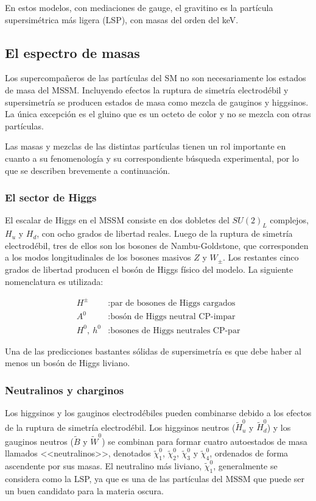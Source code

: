 En estos modelos, con mediaciones de gauge, el gravitino es la partícula supersimétrica más ligera (LSP), con masas del orden del keV.

\subsection{El espectro de masas}

Los supercompañeros de las partículas del SM no son necesariamente los estados de masa del MSSM. Incluyendo efectos la ruptura de simetría electrodébil y supersimetría se producen estados de masa como mezcla de gauginos y higgsinos. La única excepción es el gluino que es un octeto de color y no se mezcla con otras partículas.

Las masas y mezclas de las distintas partículas tienen un rol importante en cuanto a su fenomenología y su correspondiente búsqueda experimental, por lo que se describen brevemente a continuación.


\subsubsection{El sector de Higgs} 

El escalar de Higgs en el MSSM consiste en dos dobletes del $SU(2)_{L}$ complejos, $H_{u}$ y $H_{d}$, con ocho grados de libertad reales. Luego de la ruptura de simetría electrodébil, tres de ellos son los bosones de Nambu-Goldstone, que corresponden a los modos longitudinales de los bosones masivos $Z$ y $W_{\pm}$. Los restantes cinco grados de libertad producen el bosón de Higgs físico del modelo. La siguiente nomenclatura es utilizada:

\begin{align*}
  H^{\pm} & : \text{par de bosones de Higgs cargados} \\
  A^{0} & : \text{bosón de Higgs neutral CP-impar} \\
  H^{0},\: h^{0} & : \text{bosones de Higgs neutrales CP-par} 
\end{align*}

Una de las predicciones bastantes sólidas de supersimetría es que debe haber al menos un bosón de Higgs liviano.


\subsubsection{Neutralinos y charginos}

Los higgsinos y los gauginos electrodébiles pueden combinarse debido a los efectos de la ruptura de simetría electrodébil. Los higgsinos neutros ($\widetilde{H}^{0}_{u}$ y $\widetilde{H}^{0}_{d}$) y los gauginos neutros ($\widetilde{B}$ y $\widetilde{W}^{0}$) se combinan para formar cuatro autoestados de masa llamados <<neutralinos>>, denotados $\widetilde{\chi}^{0}_{1}$, $\widetilde{\chi}^{0}_{2}$, $\widetilde{\chi}^{0}_{3}$ y $\widetilde{\chi}^{0}_{4}$, ordenados de forma ascendente por sus masas. El neutralino más liviano, $\widetilde{\chi}^{0}_{1}$, generalmente se considera como la LSP, ya que es una de las partículas del MSSM que puede ser un buen candidato para la materia oscura. 

